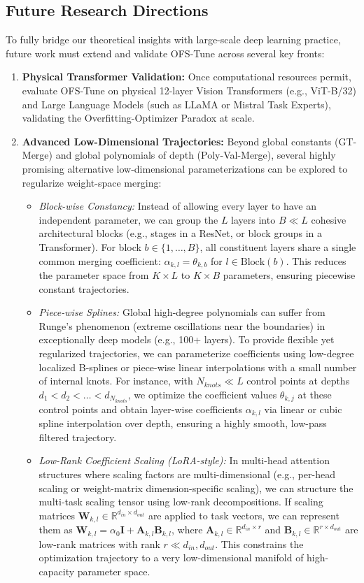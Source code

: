 \documentclass{article}
\theoremstyle{plain}
\theoremstyle{definition}
\theoremstyle{remark}
\begin{document}
\subsection{Future Research Directions}
To fully bridge our theoretical insights with large-scale deep learning practice, future work must extend and validate OFS-Tune across several key fronts:
\begin{enumerate}[noitemsep,topsep=0pt]
    \item \textbf{Physical Transformer Validation:} Once computational resources permit, evaluate OFS-Tune on physical 12-layer Vision Transformers (e.g., ViT-B/32) and Large Language Models (such as LLaMA or Mistral Task Experts), validating the Overfitting-Optimizer Paradox at scale.
    \item \textbf{Advanced Low-Dimensional Trajectories:} Beyond global constants (GT-Merge) and global polynomials of depth (Poly-Val-Merge), several highly promising alternative low-dimensional parameterizations can be explored to regularize weight-space merging:
    \begin{itemize}[noitemsep,topsep=0pt]
        \item \emph{Block-wise Constancy:} Instead of allowing every layer to have an independent parameter, we can group the $L$ layers into $B \ll L$ cohesive architectural blocks (e.g., stages in a ResNet, or block groups in a Transformer). For block $b \in \{1, \dots, B\}$, all constituent layers share a single common merging coefficient: $\alpha_{k, l} = \theta_{k, b}$ for $l \in \text{Block}(b)$. This reduces the parameter space from $K \times L$ to $K \times B$ parameters, ensuring piecewise constant trajectories.
        \item \emph{Piece-wise Splines:} Global high-degree polynomials can suffer from Runge's phenomenon (extreme oscillations near the boundaries) in exceptionally deep models (e.g., 100+ layers). To provide flexible yet regularized trajectories, we can parameterize coefficients using low-degree localized B-splines or piece-wise linear interpolations with a small number of internal knots. For instance, with $N_{knots} \ll L$ control points at depths $d_1 < d_2 < \dots < d_{N_{knots}}$, we optimize the coefficient values $\theta_{k, j}$ at these control points and obtain layer-wise coefficients $\alpha_{k, l}$ via linear or cubic spline interpolation over depth, ensuring a highly smooth, low-pass filtered trajectory.
        \item \emph{Low-Rank Coefficient Scaling (LoRA-style):} In multi-head attention structures where scaling factors are multi-dimensional (e.g., per-head scaling or weight-matrix dimension-specific scaling), we can structure the multi-task scaling tensor using low-rank decompositions. If scaling matrices $\mathbf{W}_{k, l} \in \mathbb{R}^{d_{in} \times d_{out}}$ are applied to task vectors, we can represent them as $\mathbf{W}_{k, l} = \alpha_0 \mathbf{I} + \mathbf{A}_{k, l} \mathbf{B}_{k, l}$, where $\mathbf{A}_{k, l} \in \mathbb{R}^{d_{in} \times r}$ and $\mathbf{B}_{k, l} \in \mathbb{R}^{r \times d_{out}}$ are low-rank matrices with rank $r \ll d_{in}, d_{out}$. This constrains the optimization trajectory to a very low-dimensional manifold of high-capacity parameter space.

\end{itemize}
\end{enumerate}
\end{document}
